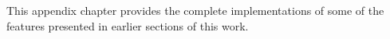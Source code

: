 
This appendix chapter provides the complete implementations of some of the features presented in earlier sections of this work.
